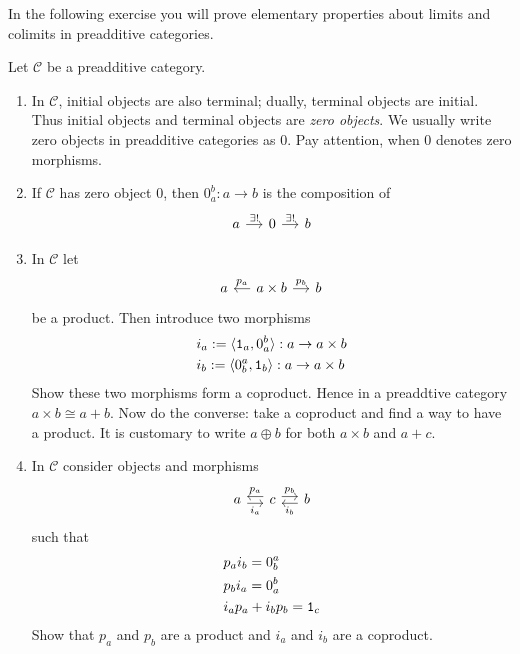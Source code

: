 In the following exercise you will prove elementary properties about
limits and colimits in preadditive categories.

\begin{exercise}
  Let \(\mathcal{C}\) be a preadditive category.
  \begin{enumerate}
  \item In \(\mathcal{C}\), initial objects are also terminal; dually, terminal
    objects are initial. Thus initial objects and terminal objects are
    {\em zero objects}. We usually write zero objects in preadditive
    categories as \(0\). Pay attention, when \(0\) denotes zero
    morphisms.

  \item If \(\mathcal{C}\) has zero object \(0\), then
    \(0_a^b : a \to b\) is the composition of
    \[
      \begin{tikzcd}[column sep=small]
        a \ar["{\exists!}", r] & 0 \ar["{\exists!}", r] & b
      \end{tikzcd}
    \]

  \item In \(\mathcal{C}\) let
    \[
      \begin{tikzcd}[column sep=small]
        a & a \times b \ar["{p_a}", l, swap] \ar["{p_b}", r] & b
      \end{tikzcd}
    \]
    be a product. Then introduce two morphisms
    \begin{align*}
      & i_a := \langle\mathtt 1_a, 0_a^b\rangle : a \to a \times b \\
      & i_b := \langle0_b^a, \mathtt 1_b\rangle : a \to a \times b
    \end{align*}
    Show these two morphisms form a coproduct. Hence in a preaddtive
    category \(a \times b \cong a + b\). Now do the converse: take a coproduct
    and find a way to have a product. It is customary to write \(a \oplus b\)
    for both \(a \times b\) and \(a + c\).

  \item In \(\mathcal{C}\) consider objects and morphisms
    \[
      \begin{tikzcd}[column sep=small]
        a \ar["{i_a}", r, swap, shift right] & c \ar["{p_a}", l,
        swap, shift right] \ar["{p_b}", r, shift left] & b \ar["{i_b}",
        l, shift left]
      \end{tikzcd}
    \]
    such that
    \begin{align*}
      & p_a i_b = 0_b^a \\
      & p_b i_a = 0_a^b \\
      & i_a p_a + i_b p_b = \mathtt 1_c
    \end{align*}
    Show that \(p_a\) and \(p_b\) are a product and \(i_a\) and \(i_b\)
    are a coproduct.
  \end{enumerate}
\end{exercise}

